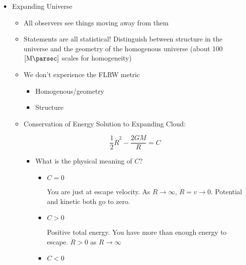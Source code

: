 \begin{itemize}
\begin{itemize}
\begin{itemize}
        \end{itemize}

    \end{itemize}

  \item Expanding Universe

    \begin{itemize}
        
      \item All observers see things moving away from them

      \item Statements are all statistical! Distinguish between structure in the universe and the geometry of the homogenous universe (about 100$[\si{\mega\parsec}]$ scales for homogeneity)

      \item We don't experience the FLRW metric

        \begin{itemize}

          \item Homogenous/geometry

          \item Structure

        \end{itemize}

      \item Conservation of Energy Solution to Expanding Cloud:

        $$\frac{1}{2}\dot{R}^2-\frac{2GM}{R}=C$$

        \begin{itemize}

          \item What is the physical meaning of $C$?

            \begin{itemize}

              \item $C=0$

                You are just at escape velocity. As $R\to\infty$, $\dot{R}=v\to0$. Potential and kinetic both go to zero.
                
              \item $C>0$

                Positive total energy. You have more than enough energy to escape. $\dot{R}>0$ as $R\to\infty$
                
              \item $C<0$


\end{itemize}
\end{itemize}
\end{itemize}
\end{itemize}
